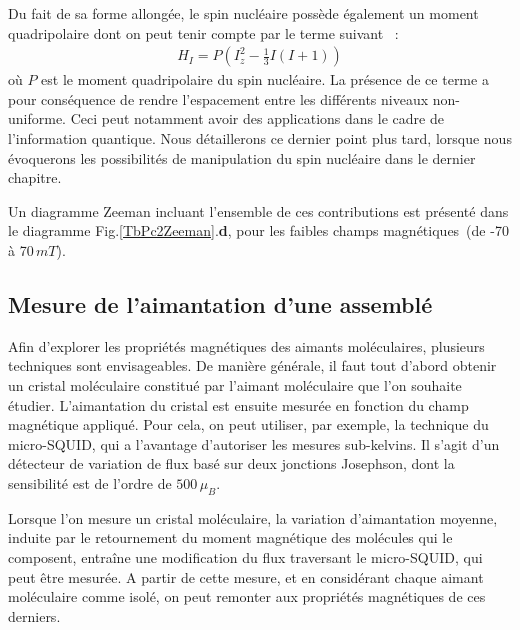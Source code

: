 Du fait de sa forme allongée, le spin nucléaire possède également un moment quadripolaire dont on peut tenir compte par le terme suivant~\cite{Bleaney1961} :
\begin{eqnarray}
H_I = P\left(I_z^2 - \frac{1}{3}I(I+1)\right)
\end{eqnarray}
où $P$ est le moment quadripolaire du spin nucléaire. La présence de ce terme a pour conséquence de rendre l'espacement entre les différents niveaux non-uniforme. Ceci peut notamment avoir des applications dans le cadre de l'information quantique. Nous détaillerons ce dernier point plus tard, lorsque nous évoquerons les possibilités de manipulation du spin nucléaire dans le dernier chapitre.

Un diagramme Zeeman incluant l'ensemble de ces contributions est présenté dans le diagramme Fig.\ref{TbPc2Zeeman}.\textbf{d}, pour les faibles champs magnétiques~(de -70 à 70$\,mT$).



\subsection{Mesure de l'aimantation d'une assemblé}
Afin d'explorer les propriétés magnétiques des aimants moléculaires, plusieurs techniques sont envisageables. De manière générale, il faut tout d'abord obtenir un cristal moléculaire constitué par l'aimant moléculaire que l'on souhaite étudier. L'aimantation du cristal est ensuite mesurée en fonction du champ magnétique appliqué. Pour cela, on peut utiliser, par exemple, la technique du micro-SQUID, qui a l'avantage d'autoriser les mesures sub-kelvins. Il s'agit d'un détecteur de variation de flux basé sur deux jonctions Josephson, dont la sensibilité est de l'ordre de $500\, \mu_B$.

Lorsque l'on mesure un cristal moléculaire, la variation d'aimantation moyenne, induite par le retournement du moment magnétique des molécules qui le composent, entraîne une modification du flux traversant le micro-SQUID, qui peut être mesurée. A partir de cette mesure, et en considérant chaque aimant moléculaire comme isolé, on peut remonter aux propriétés magnétiques de ces derniers.

